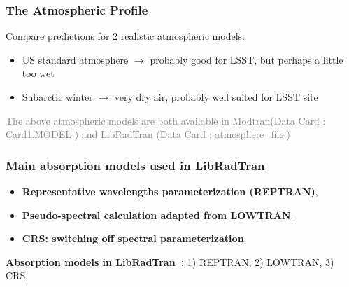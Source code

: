\documentclass{beamer}
\begin{document}

\begin{frame}
\frametitle{The Atmospheric Profile}
Compare predictions for 2 realistic atmospheric models.
\begin{itemize}
\item US standard atmosphere $\rightarrow$ probably good for LSST, but perhaps  a little too wet
\item Subarctic winter $\rightarrow$ very dry air, probably well suited for LSST site
\end{itemize}

\textcolor{gray}{The above atmospheric models are both available in Modtran(Data Card : Card1.MODEL )  and LibRadTran (Data Card : atmosphere\_file.)}

\end{frame}



\begin{frame}
\frametitle{Main  absorption models  used in LibRadTran}
\begin{itemize}
\item {\bf Representative wavelengths parameterization (REPTRAN)},
\item {\bf Pseudo-spectral calculation adapted from LOWTRAN}. 
\item {\bf CRS: switching off spectral parameterization}. 
\end{itemize} 
\begin{block} {\bf Absorption models in LibRadTran~:} 
1) REPTRAN, 2) LOWTRAN,  3) CRS, 
\end{block}

\end{frame}


\end{document}

